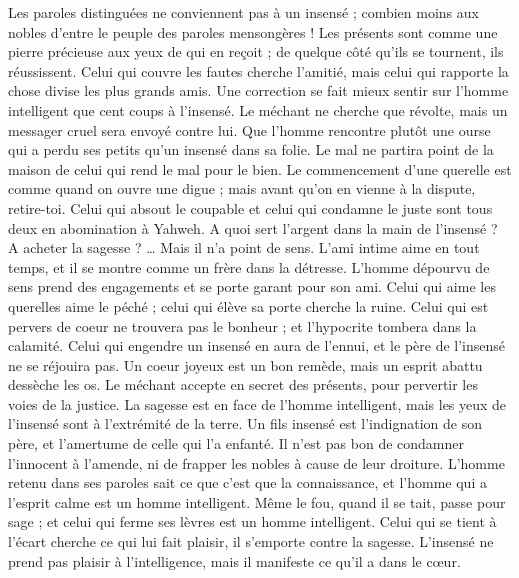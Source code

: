 \begin{multicols}{2}
Les paroles distinguées ne conviennent pas à un insensé ; combien moins aux nobles d'entre le peuple des paroles mensongères !
Les présents sont comme une pierre précieuse aux yeux de qui en reçoit ; de quelque côté qu'ils se tournent, ils réussissent.
Celui qui couvre les fautes cherche l'amitié, mais celui qui rapporte la chose divise les plus grands amis.
Une correction se fait mieux sentir sur l'homme intelligent que cent coups à l'insensé.
Le méchant ne cherche que révolte, mais un messager cruel sera envoyé contre lui.
Que l'homme rencontre plutôt une ourse qui a perdu ses petits qu'un insensé dans sa folie.
Le mal ne partira point de la maison de celui qui rend le mal pour le bien.
Le commencement d'une querelle est comme quand on ouvre une digue ; mais avant qu'on en vienne à la dispute, retire-toi.
Celui qui absout le coupable et celui qui condamne le juste sont tous deux en abomination à Yahweh.
A quoi sert l'argent dans la main de l'insensé ? A acheter la sagesse ? … Mais il n'a point de sens.
L'ami intime aime en tout temps, et il se montre comme un frère dans la détresse.
L'homme dépourvu de sens prend des engagements et se porte garant pour son ami.
Celui qui aime les querelles aime le péché ; celui qui élève sa porte cherche la ruine.
Celui qui est pervers de coeur ne trouvera pas le bonheur ; et l'hypocrite tombera dans la calamité.
Celui qui engendre un insensé en aura de l'ennui, et le père de l'insensé ne se réjouira pas.
Un coeur joyeux est un bon remède, mais un esprit abattu dessèche les os.
Le méchant accepte en secret des présents, pour pervertir les voies de la justice.
La sagesse est en face de l'homme intelligent, mais les yeux de l'insensé sont à l'extrémité de la terre.
Un fils insensé est l'indignation de son père, et l'amertume de celle qui l'a enfanté.
Il n'est pas bon de condamner l'innocent à l'amende, ni de frapper les nobles à cause de leur droiture.
L'homme retenu dans ses paroles sait ce que c'est que la connaissance, et l'homme qui a l'esprit calme est un homme intelligent.
Même le fou, quand il se tait, passe pour sage ; et celui qui ferme ses lèvres est un homme intelligent.
\VerseOne{}Celui qui se tient à l'écart cherche ce qui lui fait plaisir, il s'emporte contre la sagesse.
L'insensé ne prend pas plaisir à l'intelligence, mais il manifeste ce qu'il a dans le cœur.

\end{multicols}

